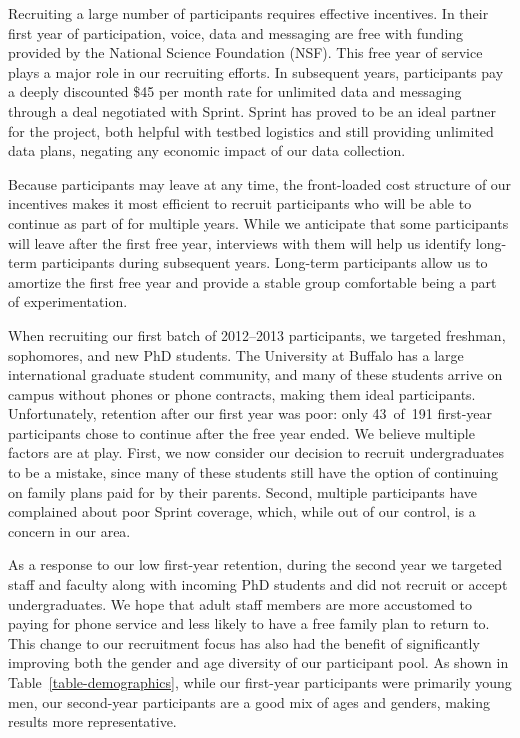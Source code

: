 Recruiting a large number of \PhoneLab{} participants requires effective
incentives. In their first year of \PhoneLab{} participation, voice, data and
messaging are free with funding provided by the National Science Foundation
(NSF). This free year of service plays a major role in our recruiting
efforts. In subsequent years, participants pay a deeply discounted \$45 per
month rate for unlimited data and messaging through a deal negotiated with
Sprint. Sprint has proved to be an ideal partner for the \PhoneLab{} project,
both helpful with testbed logistics and still providing unlimited data plans,
negating any economic impact of our data collection.



Because participants may leave at any time, the front-loaded cost structure
of our incentives makes it most efficient to recruit participants who will be
able to continue as part of \PhoneLab{} for multiple years. While we
anticipate that some participants will leave after the first free year,
interviews with them will help us identify long-term participants during
subsequent years. Long-term participants allow us to amortize the first free
year and provide a stable group comfortable being a part of \PhoneLab{}
experimentation.

When recruiting our first batch of 2012--2013 participants, we targeted
freshman, sophomores, and new PhD students. The University at Buffalo has a
large international graduate student community, and many of these students
arrive on campus without phones or phone contracts, making them ideal
\PhoneLab{} participants. Unfortunately, retention after our first year was
poor: only 43~of~191 first-year participants chose to continue after the free
year ended. We believe multiple factors are at play. First, we now consider
our decision to recruit undergraduates to be a mistake, since many of these
students still have the option of continuing on family plans paid for by
their parents. Second, multiple participants have complained about poor
Sprint coverage, which, while out of our control, is a concern in our area.

As a response to our low first-year retention, during the second year we
targeted staff and faculty along with incoming PhD students and did not
recruit or accept undergraduates. We hope that adult staff members are more
accustomed to paying for phone service and less likely to have a free family
plan to return to. This change to our recruitment focus has also had the
benefit of significantly improving both the gender and age diversity of our
participant pool. As shown in Table~\ref{table-demographics}, while our
first-year participants were primarily young men, our second-year
participants are a good mix of ages and genders, making results more
representative.

